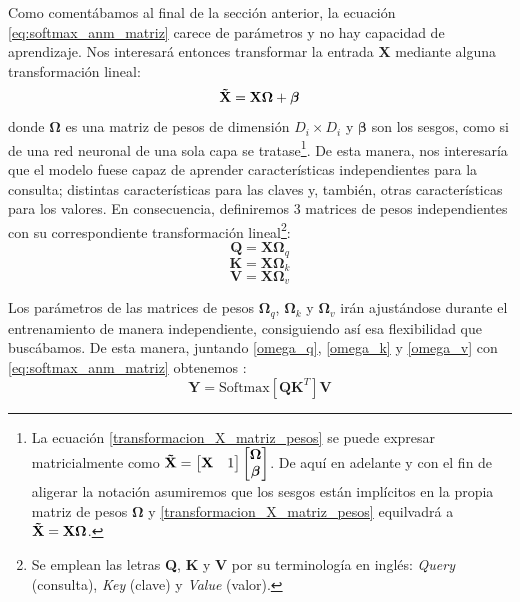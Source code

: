 Como comentábamos al final de la sección anterior, la ecuación \eqref{eq:softmax_anm_matriz} carece de parámetros y no hay capacidad de aprendizaje. Nos interesará entonces transformar la entrada $\mathbf{X}$ mediante alguna transformación lineal:
\begin{equation}
    \mathbf{\Tilde{X}} = \mathbf{X}\mathbf{\Omega} + \boldsymbol{\beta}
    \label{transformacion_X_matriz_pesos}
\end{equation}
donde $\mathbf{\Omega}$ es una matriz de pesos de dimensión $D_i \times D_i$ 
y $\boldsymbol{\beta}$ son los sesgos, como si de una red neuronal de una 
sola capa se tratase\footnote{
La ecuación \eqref{transformacion_X_matriz_pesos} se puede expresar 
matricialmente como 
$\mathbf{\Tilde{X}}= \begin{bmatrix} \mathbf{X} & 1 \end{bmatrix} \begin{bmatrix}
    \mathbf{\Omega} \\ \boldsymbol{\beta}
\end{bmatrix}$.
De aquí en adelante y con el fin de aligerar la notación  asumiremos que 
los sesgos están implícitos en la propia matriz de  pesos 
$\mathbf{\Omega}$ y \eqref{transformacion_X_matriz_pesos} equilvadrá a 
$ \mathbf{\Tilde{X}} = \mathbf{X}\mathbf{\Omega}$.}.
De esta manera, nos interesaría que el modelo fuese capaz de aprender características independientes para la consulta; distintas características para las claves y, también, otras características para los valores. En consecuencia, definiremos 3 matrices de pesos independientes con su correspondiente transformación lineal\footnote{
Se emplean las letras \textbf{Q}, \textbf{K} y \textbf{V} por su terminología en inglés: \textit{Query} (consulta), \textit{Key} (clave) y \textit{Value} (valor).
}:
\begin{equation}
    \mathbf{Q} = \mathbf{X}\mathbf{\Omega}_q 
    \label{omega_q}
\end{equation}
\begin{equation}
    \mathbf{K} = \mathbf{X}\mathbf{\Omega}_k 
    \label{omega_k}
\end{equation}
\begin{equation}
    \mathbf{V} = \mathbf{X}\mathbf{\Omega}_v
    \label{omega_v}
\end{equation}

Los parámetros de las matrices de pesos $\mathbf{\Omega}_q$, $\mathbf{\Omega}_k$ y $\mathbf{\Omega}_v$ irán ajustándose durante el entrenamiento de manera independiente, consiguiendo así esa flexibilidad que buscábamos. De esta manera, juntando \eqref{omega_q}, \eqref{omega_k} y \eqref{omega_v} con \eqref{eq:softmax_anm_matriz} obtenemos :
\begin{equation}
    \mathbf{Y} = \text{Softmax}[\mathbf{Q}  \mathbf{K}^T]\mathbf{V}
    \label{eq:eq_transformer}
\end{equation}

